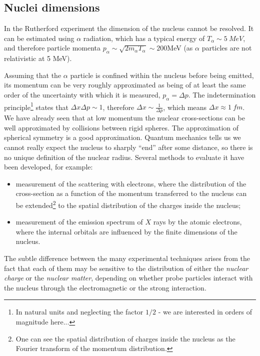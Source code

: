 

\subsection{Nuclei dimensions}
In the Rutherford experiment the dimension of the nucleus cannot be resolved. It can be estimated using $\alpha$ radiation, which has a typical energy of $T_\alpha \sim \SI{5}{MeV}$, and therefore particle momenta $p_\alpha \sim \sqrt{2m_\alpha T_\alpha} \sim 200$MeV (as $\alpha$ particles are not relativistic at 5 MeV).

Assuming that the $\alpha$ particle is confined within the nucleus before being emitted, its momentum can be very roughly approximated as being of at least the same order of the uncertainty with which it is measured, $p_\alpha = \Delta p$. The indetermination principle\footnote{In natural units and neglecting the factor \(1/2\) - we are interested in orders of magnitude here...} states that $\Delta x \Delta p \sim 1$, therefore $\Delta x \sim \frac{1}{\Delta p}$, which means $\Delta x \approx \SI{1}{fm}$. We have already seen that at low momentum the nuclear cross-sections can be well approximated by collisions between rigid spheres. The approximation of spherical symmetry is a good approximation. Quantum mechanics tells us we cannot really expect the nucleus to sharply ``end'' after some distance, so there is no unique definition of the nuclear radius. Several methods to evaluate it have been developed, for example:
\begin{itemize}
    \item measurement of the scattering with electrons, where the distribution of the cross-section as a function of the momentum transferred to the nucleus can be extended\footnote{One can see the spatial distribution of charges inside the nucleus as the Fourier transform of the momentum distribution.} to the spatial distribution of the charges inside the nucleus;
    \item measurement of the emission spectrum of \(X\) rays by the atomic electrons, where the internal orbitals are influenced by the finite dimensions of the nucleus.
\end{itemize}
The subtle difference between the many experimental techniques arises from the fact that each of them may be sensitive to the distribution of either the \emph{nuclear charge} or  the \emph{nuclear matter}, depending on whether probe particles interact with the nucleus through the electromagnetic or  the strong interaction.

